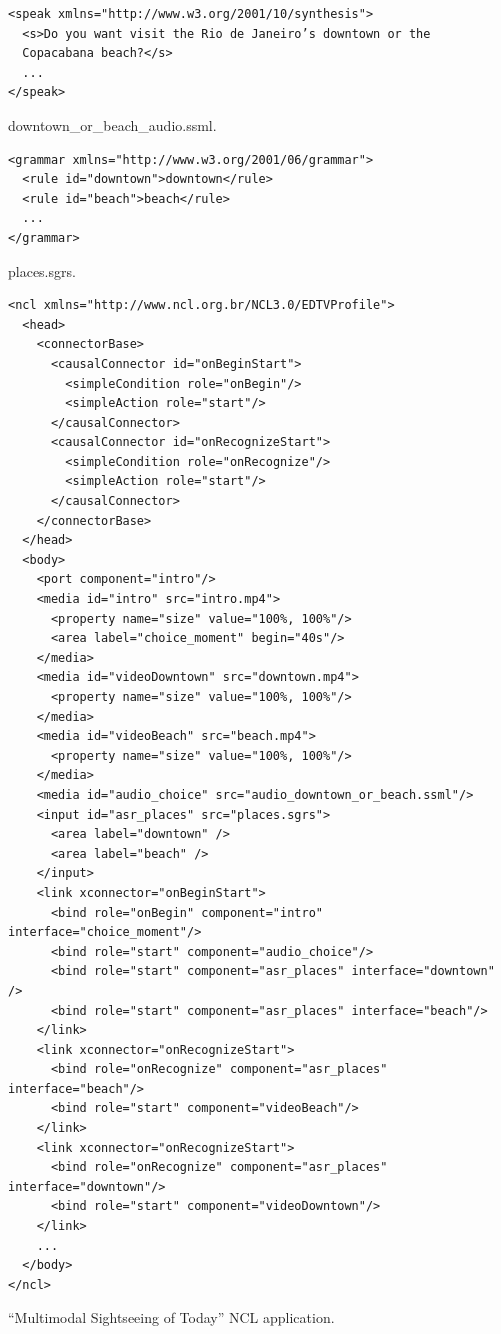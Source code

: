 \begin{listing}[!ht]
\begin{verbatim}
<speak xmlns="http://www.w3.org/2001/10/synthesis">
  <s>Do you want visit the Rio de Janeiro’s downtown or the
  Copacabana beach?</s>
  ...
</speak>
\end{verbatim}
\caption{downtown\_or\_beach\_audio.ssml.}
\label{list:ssml}
\end{listing}

\begin{listing}[!ht]
\begin{verbatim}
<grammar xmlns="http://www.w3.org/2001/06/grammar">
  <rule id="downtown">downtown</rule>
  <rule id="beach">beach</rule>
  ...
</grammar>
\end{verbatim}
\caption{places.sgrs.}
\label{list:srgs}
\end{listing}

\begin{verbatim}
<ncl xmlns="http://www.ncl.org.br/NCL3.0/EDTVProfile">
  <head>
    <connectorBase>
      <causalConnector id="onBeginStart">
        <simpleCondition role="onBegin"/>
        <simpleAction role="start"/>
      </causalConnector>
      <causalConnector id="onRecognizeStart">
        <simpleCondition role="onRecognize"/>
        <simpleAction role="start"/>
      </causalConnector>
    </connectorBase>
  </head>
  <body>
    <port component="intro"/>
    <media id="intro" src="intro.mp4">
      <property name="size" value="100%, 100%"/>
      <area label="choice_moment" begin="40s"/>
    </media>
    <media id="videoDowntown" src="downtown.mp4">
      <property name="size" value="100%, 100%"/>
    </media>
    <media id="videoBeach" src="beach.mp4">
      <property name="size" value="100%, 100%"/>
    </media>
    <media id="audio_choice" src="audio_downtown_or_beach.ssml"/>
    <input id="asr_places" src="places.sgrs">
      <area label="downtown" />
      <area label="beach" />
    </input>
    <link xconnector="onBeginStart">
      <bind role="onBegin" component="intro" interface="choice_moment"/>
      <bind role="start" component="audio_choice"/>
      <bind role="start" component="asr_places" interface="downtown" />
      <bind role="start" component="asr_places" interface="beach"/>
    </link>
    <link xconnector="onRecognizeStart">
      <bind role="onRecognize" component="asr_places" interface="beach"/>
      <bind role="start" component="videoBeach"/>
    </link>
    <link xconnector="onRecognizeStart">
      <bind role="onRecognize" component="asr_places" interface="downtown"/>
      <bind role="start" component="videoDowntown"/>
    </link>
    ...
  </body>
</ncl>
\end{verbatim}
\begin{listing}[!ht]
\caption{“Multimodal Sightseeing of Today” NCL application.}
\label{list:ncl-sightseeing}
\end{listing}

